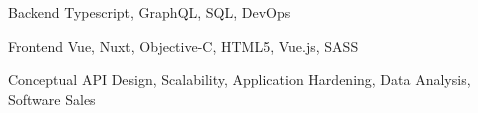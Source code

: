 

\begin{cvskills}

  \cvskill
    {Backend} %
    {Typescript, GraphQL, SQL, DevOps} %

  \cvskill
    {Frontend} %
    {Vue, Nuxt, Objective-C, HTML5, Vue.js, SASS} %
    
  \cvskill
    {Conceptual} %
    {API Design, Scalability, Application Hardening, Data Analysis, Software Sales} %

\end{cvskills}
